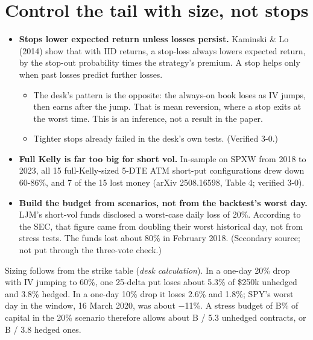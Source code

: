 \documentclass{article}
\begin{document}
\section{Control the tail with size, not stops}

\begin{itemize}

\item \textbf{Stops lower expected return unless losses persist.} Kaminski \& Lo (2014) show that with IID returns, a stop-loss always lowers expected return, by the stop-out probability times the strategy's premium. A stop helps only when past losses predict further losses.

\begin{itemize}

\item The desk's pattern is the opposite: the always-on book loses as IV jumps, then earns after the jump. That is mean reversion, where a stop exits at the worst time. This is an inference, not a result in the paper.

\item Tighter stops already failed in the desk's own tests. (Verified 3-0.)

\end{itemize}

\item \textbf{Full Kelly is far too big for short vol.} In-sample on SPXW from 2018 to 2023, all 15 full-Kelly-sized 5-DTE ATM short-put configurations drew down 60-86\%, and 7 of the 15 lost money (arXiv 2508.16598, Table 4; verified 3-0).

\item \textbf{Build the budget from scenarios, not from the backtest's worst day.} LJM's short-vol funds disclosed a worst-case daily loss of 20\%. According to the SEC, that figure came from doubling their worst historical day, not from stress tests. The funds lost about 80\% in February 2018. (Secondary source; not put through the three-vote check.)

\end{itemize}

Sizing follows from the strike table (\emph{desk calculation}). In a one-day 20\% drop with IV jumping to 60\%, one 25-delta put loses about 5.3\% of \$250k unhedged and 3.8\% hedged. In a one-day 10\% drop it loses 2.6\% and 1.8\%; SPY's worst day in the window, 16 March 2020, was about \ensuremath{-}11\%. A stress budget of B\% of capital in the 20\% scenario therefore allows about B /\allowbreak{} 5.3 unhedged contracts, or B /\allowbreak{} 3.8 hedged ones.
\end{document}
